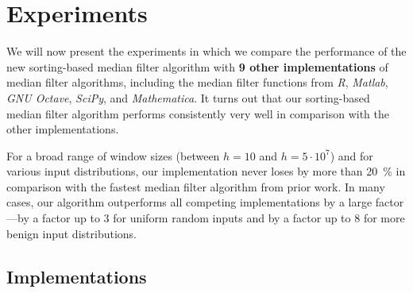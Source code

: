 \documentclass[a4paper,11pt]{article}
\begin{document}
\section{Experiments}

We will now present the experiments in which we compare the performance of the new sorting-based median filter algorithm with \textbf{9 other implementations} of median filter algorithms, including the median filter functions from \emph{R}, \emph{Matlab}, \emph{GNU Octave}, \emph{SciPy}, and \emph{Mathematica}. It turns out that our sorting-based median filter algorithm performs consistently very well in comparison with the other implementations.

For a broad range of window sizes (between $h = 10$ and $h = 5\cdot10^7$) and for various input distributions, our implementation never loses by more than 20~\% in comparison with the fastest median filter algorithm from prior work. In many cases, our algorithm outperforms all competing implementations by a large factor---by a factor up to $3$ for uniform random inputs and by a factor up to $8$ for more benign input distributions.


\subsection{Implementations}\label{ssec:impl}
\end{document}
